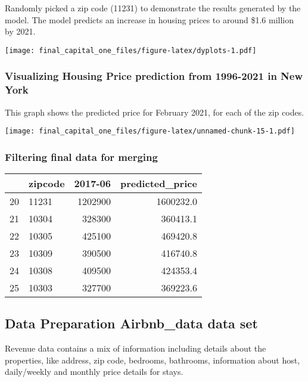 \documentclass[
]{article}
\begin{document}
Randomly picked a zip code (11231) to demonstrate the results generated
by the model. The model predicts an increase in housing prices to around
\$1.6 million by 2021.

\texttt{[image: final\_capital\_one\_files/figure-latex/dyplots-1.pdf]}

\hypertarget{visualizing-housing-price-prediction-from-1996-2021-in-new-york}{%
\subsubsection{Visualizing Housing Price prediction from 1996-2021 in
New
York}\label{visualizing-housing-price-prediction-from-1996-2021-in-new-york}}

This graph shows the predicted price for February 2021, for each of the
zip codes.

\texttt{[image: final\_capital\_one\_files/figure-latex/unnamed-chunk-15-1.pdf]}

\hypertarget{filtering-final-data-for-merging}{%
\subsubsection{Filtering final data for
merging}\label{filtering-final-data-for-merging}}

\begin{table}[H]
\centering
\begin{tabular}{l|l|r|r}
\hline
  & zipcode & 2017-06 & predicted\_price\\
\hline
20 & 11231 & 1202900 & 1600232.0\\
\hline
21 & 10304 & 328300 & 360413.1\\
\hline
22 & 10305 & 425100 & 469420.8\\
\hline
23 & 10309 & 390500 & 416740.8\\
\hline
24 & 10308 & 409500 & 424353.4\\
\hline
25 & 10303 & 327700 & 369223.6\\
\hline
\end{tabular}
\end{table}

\hypertarget{data-preparation-airbnb_data-data-set}{%
\subsection{Data Preparation Airbnb\_data data
set}\label{data-preparation-airbnb_data-data-set}}

Revenue data contains a mix of information including details about the
properties, like address, zip code, bedrooms, bathrooms, information
about host, daily/weekly and monthly price details for stays.
\end{document}
